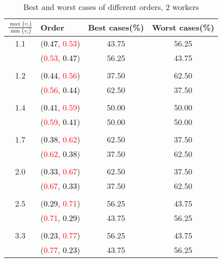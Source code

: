 \documentclass[10pt,a4paper]{report}
\begin{document}
    \begin{center}
	\small
	\begin{longtable}{clcc}
		\caption{Best and worst cases of different orders, 2 workers}\\
		\toprule
		\setlength{\tabcolsep}{1mm}
		\renewcommand\baselinestretch{0.5}\selectfont
		$\frac{\max\{v_i\}}{\min\{v_i\}}$ & Order & Best cases(\%) & Worst cases(\%) \\
			\midrule		1.1			&(\textcolor{black}{0.47}, \textcolor{red}{0.53})&43.75&56.25\\
			&(\textcolor{red}{0.53}, \textcolor{black}{0.47})&56.25&43.75\\
		&&&\\
		1.2			&(\textcolor{black}{0.44}, \textcolor{red}{0.56})&37.50&62.50\\
			&(\textcolor{red}{0.56}, \textcolor{black}{0.44})&62.50&37.50\\
		&&&\\
		1.4			&(\textcolor{black}{0.41}, \textcolor{red}{0.59})&50.00&50.00\\
			&(\textcolor{red}{0.59}, \textcolor{black}{0.41})&50.00&50.00\\
		&&&\\
		1.7			&(\textcolor{black}{0.38}, \textcolor{red}{0.62})&62.50&37.50\\
			&(\textcolor{red}{0.62}, \textcolor{black}{0.38})&37.50&62.50\\
		&&&\\
		2.0			&(\textcolor{black}{0.33}, \textcolor{red}{0.67})&62.50&37.50\\
			&(\textcolor{red}{0.67}, \textcolor{black}{0.33})&37.50&62.50\\
		&&&\\
		2.5			&(\textcolor{black}{0.29}, \textcolor{red}{0.71})&56.25&43.75\\
			&(\textcolor{red}{0.71}, \textcolor{black}{0.29})&43.75&56.25\\
		&&&\\
		3.3			&(\textcolor{black}{0.23}, \textcolor{red}{0.77})&56.25&43.75\\
			&(\textcolor{red}{0.77}, \textcolor{black}{0.23})&43.75&56.25\\
		\bottomrule
	\end{longtable}
\end{center}
\end{document}
